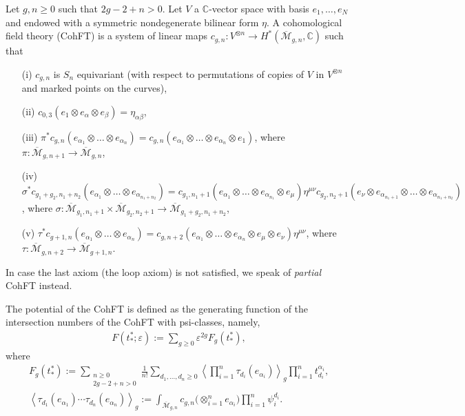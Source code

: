 \documentclass[pdftex]{sigma}
\numberwithin{equation}{section}
\newcommand{\mbC}{\mathbb C}
\newcommand{\oM}{\overline{\mathcal M}}
\newcommand{\<}{\left<}
\renewcommand{\>}{\right>}
\newcommand{\eps}{\varepsilon}
\begin{document}
Let $g,n \ge 0$ such that $2g-2+n>0$. Let $V$ a $\mbC$-vector space with basis $e_1,\dots,e_N$ and endowed with a symmetric nondegenerate bilinear form $\eta$. A cohomological f\/ield theory (CohFT) is a system of linear maps $c_{g,n}\colon V^{\otimes n} \to H^*(\oM_{g,n},\mbC)$ such that
\begin{itemize}\itemsep=0pt
\item[(i)] $c_{g,n}$ is $S_n$ equivariant (with respect to permutations of copies of $V$ in $V^{\otimes n}$ and marked points on the curves),
\item[(ii)] $c_{0,3}(e_1 \otimes e_\alpha \otimes e_\beta)=\eta_{\alpha \beta}$,
\item[(iii)] $\pi^*c_{g,n}(e_{\alpha_1}\otimes\dots \otimes e_{\alpha_n}) = c_{g,n}(e_{\alpha_1}\otimes\dots\otimes e_{\alpha_n}\otimes e_1)$,
where $\pi\colon \oM_{g,n+1}\to \oM_{g,n}$,
\item[(iv)] $\sigma^*c_{g_1+g_2,n_1+n_2}(e_{\alpha_1}\otimes\dots \otimes e_{\alpha_{n_1+n_2}}) = c_{g_1,n_1+1}(e_{\alpha_1}\otimes\dots\otimes e_{\alpha_{n_1}}\otimes e_\mu) \eta^{\mu \nu} c_{g_2,n_2+1}(e_\nu \otimes e_{\alpha_{n_1+1}}\otimes\dots\otimes e_{\alpha_{n_1+n_2}})$,
where $\sigma\colon \oM_{g_1,n_1+1}\times \oM_{g_2,n_2+1} \to \oM_{g_1+g_2,n_1+n_2}$,
\item[(v)] $\tau^*c_{g+1,n}(e_{\alpha_1}\otimes\dots \otimes e_{\alpha_{n}}) = c_{g,n+2}(e_{\alpha_1}\otimes \dots \otimes e_{\alpha_n}\otimes e_\mu \otimes e_\nu) \eta^{\mu\nu}$, where $\tau\colon \oM_{g,n+2}\to \oM_{g+1,n}$.
\end{itemize}

In case the last axiom (the loop axiom) is not satisf\/ied, we speak of \emph{partial} CohFT instead.

The potential of the CohFT is def\/ined as the generating function of the intersection numbers of the CohFT with psi-classes, namely,
\begin{gather*}
F(t^*_*;\eps):=\sum_{g\ge 0}\eps^{2g}F_g(t^*_*),
\end{gather*}
where
\begin{gather*}
F_g(t^*_*):=\sum_{\substack{n\ge 0\\2g-2+n>0}}\frac{1}{n!}\sum_{d_1,\dots,d_n\ge 0}\<\prod_{i=1}^n\tau_{d_i}(e_{\alpha_i})\>_g\prod_{i=1}^nt^{\alpha_i}_{d_i},\\
\<\tau_{d_1}(e_{\alpha_1})\cdots\tau_{d_n}(e_{\alpha_n})\>_g:=\int_{\oM_{g,n}}c_{g,n}\big({\otimes}_{i=1}^n e_{\alpha_i}\big)\prod_{i=1}^n\psi_i^{d_i}.
\end{gather*}
\end{document}
